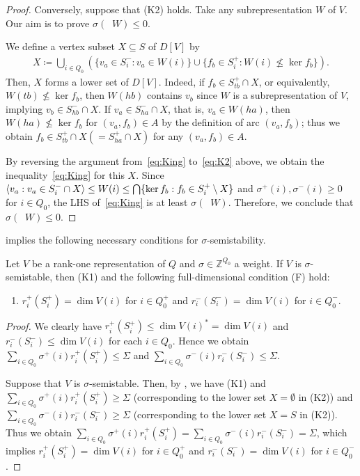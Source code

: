 \documentclass[a4paper,11pt]{article}
\numberwithin{equation}{section}
\newcommand{\Z}{\mathbb{Z}}
\DeclareMathOperator{\dimv}{\underline{dim}}
\DeclarePairedDelimiter{\spnn}{\langle}{\rangle}
\begin{document}
\begin{proof}
Conversely, suppose that (K2) holds.
Take any subrepresentation $W$ of $V$.
Our aim is to prove $\sigma(\dimv W) \leq 0$.

We define a vertex subset $X \subseteq S$ of $D[V]$ by
\begin{align}
    X \coloneqq \bigcup_{i \in Q_0} \left(\{ v_a \in S_i^- : v_a \in W(i) \} \cup \{ f_b \in S_i^+ : W(i) \not\leq \ker f_b \} \right).
\end{align}
Then, $X$ forms a lower set of $D[V]$.
Indeed, if $f_b \in S_{tb}^+ \cap X$, or equivalently, $W(tb) \not\leq \ker f_b$,
then $W(hb)$ contains $v_b$ since $W$ is a subrepresentation of $V$, implying $v_b \in S_{hb}^- \cap X$.
If $v_a \in S_{ha}^- \cap X$, that is, $v_a \in W(ha)$, then $W(ha) \not\leq \ker f_b$ for $(v_a, f_b) \in A$ by the definition of arc $(v_a, f_b)$; thus we obtain $f_b \in S_{tb}^+ \cap X (= S_{ha}^+ \cap X)$ for any $(v_a, f_b) \in A$.

By reversing the argument from~\eqref{eq:King} to~\eqref{eq:K2} above,
we obtain the inequality~\eqref{eq:King} for this $X$.
Since $\spnn{v_a : v_a \in S_i^- \cap X} \leq W(i) \leq \bigcap \{ \ker f_b : f_b \in S_i^+ \setminus X \}$ and $\sigma^+(i), \sigma^-(i) \geq 0$ for $i \in Q_0$,
the LHS of~\eqref{eq:King} is at least $\sigma(\dimv W)$.
Therefore, we conclude that $\sigma(\dimv W) \leq 0$.
\end{proof}

 implies the following necessary conditions for $\sigma$-semistability.
\begin{corollary}\label{cor:necessary}
    Let $V$ be a rank-one representation of $Q$ and $\sigma \in \Z^{Q_0}$ a weight.
    If $V$ is $\sigma$-semistable,
    then {\rm (K1)} and the following full-dimensional condition {\rm (F)} hold:
    \begin{enumerate}[{label={\upshape{(F)}}}]
        \item $r_i^+(S_i^+) = \dim V(i)$ for $i \in Q_0^+$ and $r_i^-(S_i^-) = \dim V(i)$ for $i \in Q_0^-$.
    \end{enumerate}
\end{corollary}
\begin{proof}
    We clearly have $r_i^+(S_i^+) \leq \dim V(i)^* = \dim V(i)$ and $r_i^-(S_i^-) \leq \dim V(i)$ for each $i \in Q_0$.
    Hence we obtain $\sum_{i \in Q_0} \sigma^+(i) r_i^+(S_i^+) \leq \Sigma$ and $\sum_{i \in Q_0} \sigma^-(i) r_i^-(S_i^-) \leq \Sigma$.

    Suppose that $V$ is $\sigma$-semistable.
    Then, by ,
    we have (K1) and $\sum_{i \in Q_0} \sigma^+(i) r_i^+(S_i^+) \geq \Sigma$ (corresponding to the lower set $X = \emptyset$ in (K2))
    and $\sum_{i \in Q_0} \sigma^-(i) r_i^-(S_i^-) \geq \Sigma$ (corresponding to the lower set $X = S$ in (K2)).
    Thus we obtain $\sum_{i \in Q_0} \sigma^+(i) r_i^+(S_i^+) = \sum_{i \in Q_0} \sigma^-(i) r_i^-(S_i^-) = \Sigma$,
    which implies $r_i^+(S_i^+) = \dim V(i)$ for $i \in Q_0^+$ and $r_i^-(S_i^-) = \dim V(i)$ for $i \in Q_0^-$.
\end{proof}
\end{document}
